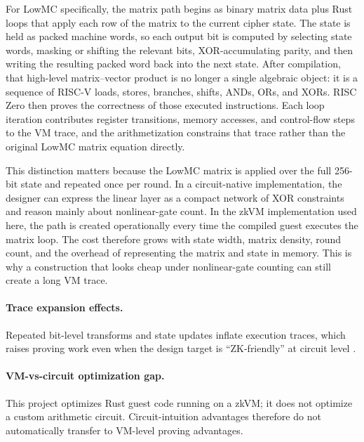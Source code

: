 For LowMC specifically, the matrix path begins as binary matrix data plus Rust
loops that apply each row of the matrix to the current cipher state. The state is
held as packed machine words, so each output bit is computed by selecting state
words, masking or shifting the relevant bits, XOR-accumulating parity, and then
writing the resulting packed word back into the next state. After compilation,
that high-level matrix--vector product is no longer a single algebraic object: it
is a sequence of RISC-V loads, stores, branches, shifts, ANDs, ORs, and XORs.
RISC Zero then proves the correctness of those executed instructions. Each loop
iteration contributes register transitions, memory accesses, and control-flow
steps to the VM trace, and the arithmetization constrains that trace rather than
the original LowMC matrix equation directly.

This distinction matters because the LowMC matrix is applied over the full
256-bit state and repeated once per round. In a circuit-native implementation,
the designer can express the linear layer as a compact network of XOR constraints
and reason mainly about nonlinear-gate count. In the zkVM implementation used
here, the path is created operationally every time the compiled guest executes
the matrix loop. The cost therefore grows with state width, matrix density, round
count, and the overhead of representing the matrix and state in memory. This is
why a construction that looks cheap under nonlinear-gate counting can still
create a long VM trace.

\paragraph{Trace expansion effects.}
Repeated bit-level transforms and state updates inflate execution traces, which
raises proving work even when the design target is ``ZK-friendly'' at circuit
level \cite{risczeroTraceDocs}.

\paragraph{VM-vs-circuit optimization gap.}
This project optimizes Rust guest code running on a zkVM; it does not optimize a
custom arithmetic circuit. Circuit-intuition advantages therefore do not automatically
transfer to VM-level proving advantages.

